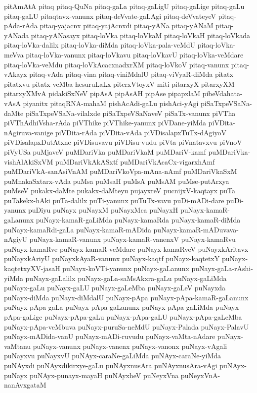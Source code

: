 {pitAmAtA
pitaq
pitaq-QuNa
pitaq-gaLa
pitaq-gaLigU
pitaq-gaLige
pitaq-gaLu
pitaq-gaLU
pitaqtavx-vanunx
pitaq-deVvate-gaLAgi
pitaq-deVvateyeV
pitaq-pAda-rAda
pitaq-yajacnx
pitaq-yajAcnxdi
pitaq-yANa
pitaq-yANaM
pitaq-yANada
pitaq-yANasayx
pitaq-loVka
pitaq-loVkaM
pitaq-loVkaH
pitaq-loVkada
pitaq-loVka-dalilx
pitaq-loVka-diMda
pitaq-loVka-pala-veMdU
pitaq-loVka-meVva
pitaq-loVka-vanunx
pitaq-loVkavu
pitaq-loVkavU
pitaq-loVka-veMdare
pitaq-loVka-veMdu
pitaq-loVkAcacxnadxrXM
pitaq-loVkoV
pitaq-vanunx
pitaq-vAkayx
pitaq-vAda
pitaq-vina
pitaq-viniMdalU
pitaq-viVyaR-diMda
pitatx
pitatxvu
pitatx-veMba-hesuruLaLx
piterxVtoyxV-miti
pitarxyX
pitarxyXM
pitarxyXMvA
pidakiSxNeV
pipAsA
pipAsAH
pipAse
pipapxlaM
pibeVdahata-vAsA
piyanitx
pitaqRNA-mahaM
pishAcAdi-gaLu
pishAci-yAgi
piSaTxpeVSaNa-daMte
piSaTxpeVSaNa-vilalxde
piSaTxpeVSaNaveV
piSaTx-vanunx
piVTha
piVThAdhiVsha-rAda
piVThike
piVThike-yanunx
piVDane-yiMda
piVDita-nAgiruva-vanige
piVDita-rAda
piVDita-vAda
piVDisalapxTuTx-dAgiyoV
piVDisalapxDutAtxne
piVDisuvavu
piVDisu-vudu
piVta
piVnatavxvu
piVnoV
piVyUSa
puMjaveV
puMDariVka
puMDariVkaM
puMDariV-kamf
puMDariVka-vishAlAkiSxVM
puMDariVkAkASxtf
puMDariVkAcaCx-vigarxhAmf
puMDariVkA-sanAsiVnAM
puMDariVkoVpa-mAna-nAmf
puMDariVkaSxM
puMnakaSxtarx-vAda
puMsa
puMsaH
puMsA
puMsAM
puMse-putArxya
puMseV
pukakx-daMte
pukakx-daMteyu
pujayxreV
pucnijxV-kaqtayx
puTa
puTakekx-hAki
puTa-dalilx
puTi-yanunx
puTuTx-vavu
puDi-mADi-dare
puDi-yanunx
puDiyu
puNayx
puNayxM
puNayxMca
puNayxH
puNayx-kamaR-gaLanunx
puNayx-kamaR-gaLiMda
puNayx-kamaRda
puNayx-kamaR-diMda
puNayx-kamaRdi-gaLa
puNayx-kamaR-mADida
puNayx-kamaR-mADuvava-nAgiyU
puNayx-kamaR-vanunx
puNayx-kamaR-vanenxV
puNayx-kamaRvu
puNayx-kamaRve
puNayx-kamaR-veMdare
puNayx-kamaRveV
puNayxkAritavx
puNayxkAriyU
puNayxkAyaR-vanunx
puNayx-kaqtf
puNayx-kaqtetxY
puNayx-kaqtetxyXV-jasaH
puNayx-koVTi-yanunx
puNayx-gaLanunx
puNayx-gaLa-rAshi-yiMda
puNayx-gaLalilx
puNayx-gaLa-saMsAkxra-gaLu
puNayx-gaLiMda
puNayx-gaLu
puNayx-gaLU
puNayx-gaLeMba
puNayx-gaLeV
puNayxda
puNayx-diMda
puNayx-diMdalU
puNayx-pApa
puNayx-pApa-kamaR-gaLanunx
puNayx-pApa-gaLa
puNayx-pApa-gaLanunx
puNayx-pApa-gaLiMda
puNayx-pApa-gaLige
puNayx-pApa-gaLu
puNayx-pApa-gaLU
puNayx-pApa-gaLeMba
puNayx-pApa-veMbuva
puNayx-puruSa-neMdU
puNayx-Palada
puNayx-PalavU
puNayx-mADida-vanU
puNayx-mADi-ruvudu
puNayx-vaMta-nAdare
puNayx-vaMtanu
puNayx-vanunx
puNayx-vanenx
puNayx-vanonx
puNayx-vAgali
puNayxvu
puNayxvU
puNAyx-caraNe-gaLiMda
puNAyx-caraNe-yiMda
puNAyxdi
puNAyxdikirxye-gaLu
puNAyxnusAra
puNAyxnusAra-vAgi
puNAyx-puNayx
puNAyx-punayx-mayaH
puNAyxheV
puNeyxVna
puNeyxVnA-nanAvxgataM
}
